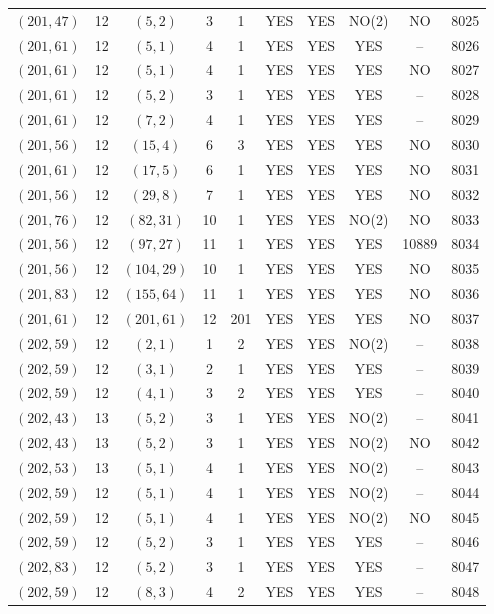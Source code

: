 \begin{longtable}{|c|c|c|c|c|c|c|c|c|c|}
$(201, 47)$ & 12 & $(5, 2)$ & 3 & 1 & YES & YES & NO(2) & NO & 8025\\
$(201, 61)$ & 12 & $(5, 1)$ & 4 & 1 & YES & YES & YES & -- & 8026\\
$(201, 61)$ & 12 & $(5, 1)$ & 4 & 1 & YES & YES & YES & NO & 8027\\
$(201, 61)$ & 12 & $(5, 2)$ & 3 & 1 & YES & YES & YES & -- & 8028\\
$(201, 61)$ & 12 & $(7, 2)$ & 4 & 1 & YES & YES & YES & -- & 8029\\
$(201, 56)$ & 12 & $(15, 4)$ & 6 & 3 & YES & YES & YES & NO & 8030\\
$(201, 61)$ & 12 & $(17, 5)$ & 6 & 1 & YES & YES & YES & NO & 8031\\
$(201, 56)$ & 12 & $(29, 8)$ & 7 & 1 & YES & YES & YES & NO & 8032\\
$(201, 76)$ & 12 & $(82, 31)$ & 10 & 1 & YES & YES & NO(2) & NO & 8033\\
$(201, 56)$ & 12 & $(97, 27)$ & 11 & 1 & YES & YES & YES & 10889 & 8034\\
$(201, 56)$ & 12 & $(104, 29)$ & 10 & 1 & YES & YES & YES & NO & 8035\\
$(201, 83)$ & 12 & $(155, 64)$ & 11 & 1 & YES & YES & YES & NO & 8036\\
$(201, 61)$ & 12 & $(201, 61)$ & 12 & 201 & YES & YES & YES & NO & 8037\\
$(202, 59)$ & 12 & $(2, 1)$ & 1 & 2 & YES & YES & NO(2) & -- & 8038\\
$(202, 59)$ & 12 & $(3, 1)$ & 2 & 1 & YES & YES & YES & -- & 8039\\
$(202, 59)$ & 12 & $(4, 1)$ & 3 & 2 & YES & YES & YES & -- & 8040\\
$(202, 43)$ & 13 & $(5, 2)$ & 3 & 1 & YES & YES & NO(2) & -- & 8041\\
$(202, 43)$ & 13 & $(5, 2)$ & 3 & 1 & YES & YES & NO(2) & NO & 8042\\
$(202, 53)$ & 13 & $(5, 1)$ & 4 & 1 & YES & YES & NO(2) & -- & 8043\\
$(202, 59)$ & 12 & $(5, 1)$ & 4 & 1 & YES & YES & NO(2) & -- & 8044\\
$(202, 59)$ & 12 & $(5, 1)$ & 4 & 1 & YES & YES & NO(2) & NO & 8045\\
$(202, 59)$ & 12 & $(5, 2)$ & 3 & 1 & YES & YES & YES & -- & 8046\\
$(202, 83)$ & 12 & $(5, 2)$ & 3 & 1 & YES & YES & YES & -- & 8047\\
$(202, 59)$ & 12 & $(8, 3)$ & 4 & 2 & YES & YES & YES & -- & 8048\\

\end{longtable}
